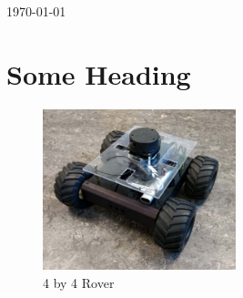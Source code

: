 \documentclass[a4paper,10pt]{article}
\begin{document}
\begin{titlepage}
	
	
	\vfill\vfill\vfill %
	
	{\large\today} %
	
	
	 
	
	\vfill %
	
\end{titlepage}



\renewcommand{\labelenumi}{\alph{enumi})}


\section*{Some Heading}

\begin{figure}[H]
\centering
 \includegraphics[width=0.5\textwidth]{rover_pic.png}
 \caption{4 by 4 Rover}
 \label{fig:1}
\end{figure}
\end{document}
